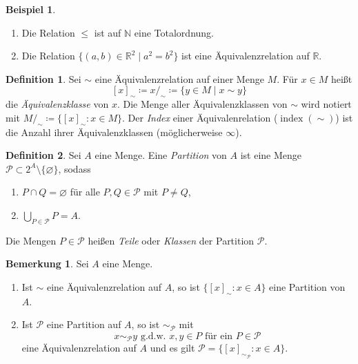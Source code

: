 \documentclass[11pt, a4paper]{article}
\theoremstyle{definition}
\newtheorem{definition}{Definition}[section]
\newtheorem*{example*}{Beispiel}
\newtheorem*{remark*}{Bemerkung}
\theoremstyle{plain}
\numberwithin{equation}{section}
\DeclareMathOperator{\ind}{index}
\let\emptyset\varnothing
\begin{document}
\begin{example*}
	\
	\begin{enumerate}
		\item Die Relation $\leq$ ist auf $\mathbb{N}$ eine Totalordnung.
		\item Die Relation $\{(a, b) \in \mathbb{R}^2 \mid a^2 = b^2 \}$ ist eine Äquivalenzrelation auf $\mathbb{R}$.
	\end{enumerate}
\end{example*}
\begin{definition}\label{def:equivalenceclass}
	Sei $\sim$ eine Äquivalenzrelation auf einer Menge $M$. Für $x \in M$ heißt
	$$
		[x]_\sim \coloneqq x /_\sim \coloneqq \{ y \in M \mid x \sim y \}
	$$
	die \textit{Äquivalenzklasse} von $x$. Die Menge aller Äquivalenzklassen von $\sim$ wird notiert mit $M /_\sim \coloneqq \{ [x]_\sim : x \in M \}$. Der \textit{Index} einer Äquivalenrelation ($\ind(\sim)$) ist die Anzahl ihrer Äquivalenzklassen (möglicherweise $\infty$).
\end{definition}
\begin{definition}
	Sei $A$ eine Menge. Eine \textit{Partition} von $A$ ist eine Menge $\mathcal{P} \subset 2^A \setminus \{ \emptyset \}$, sodass
	\begin{enumerate}
		\item $P \cap Q = \emptyset$ für alle $P, Q \in \mathcal{P}$ mit $P \neq Q$,
		\item $\bigcup_{P \in \mathcal{P}} P = A$.
	\end{enumerate}
	Die Mengen $P \in \mathcal{P}$ heißen \textit{Teile} oder \textit{Klassen} der Partition $\mathcal{P}$.
\end{definition}
\begin{remark*}
	Sei $A$ eine Menge.
	\begin{enumerate}
		\item Ist $\sim$ eine Äquivalenzrelation auf $A$, so ist $\{[x]_\sim : x \in A\}$ eine Partition von $A$.
		\item Ist $\mathcal{P}$ eine Partition auf $A$, so ist $\sim_\mathcal{P}$ mit
			$$
				x \sim_\mathcal{P} y \text{ g.d.w. } x, y \in P  \text{ für ein } P \in \mathcal{P}
			$$
			eine Äquivalenzrelation auf $A$ und es gilt $\mathcal{P} = \{[x]_{\sim_\mathcal{P}} : x \in A\}$.
	\end{enumerate}
\end{remark*}
\end{document}
